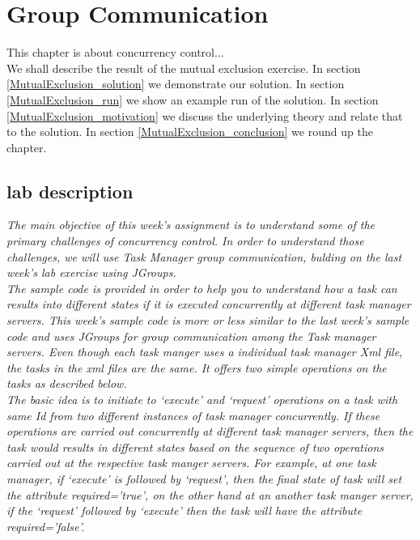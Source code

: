 \chapter{Group Communication}
\minitoc

This chapter is about concurrency control...  \\

We shall describe the result of the mutual exclusion exercise. In section \ref{MutualExclusion_solution} we demonstrate our solution. In section \ref{MutualExclusion_run} we show an example run of the solution. In section \ref{MutualExclusion_motivation} we discuss the underlying theory and relate that to the solution. In section \ref{MutualExclusion_conclusion} we round up the chapter.

\section{lab description}
\textit{The main objective of this week’s assignment is to understand some of the primary challenges of concurrency control. In order to understand those challenges, we will use Task Manager group communication, bulding on the last week’s lab exercise using JGroups.}\\

\textit{The sample code is provided in order to help you to understand how a task can results into different states if it is executed concurrently at different task manager servers. This week’s sample code is more or less similar to the last week’s sample code and uses JGroups for group communication among the Task manager servers. Even though each task manger uses a individual task manager Xml file, the tasks in the xml files are the same. It offers two simple operations on the tasks as described below.}\\



\textit{The basic idea is to initiate to ‘execute’ and ‘request’ operations on a task with same Id from two different instances of task manager concurrently. If these operations are carried out concurrently at different task manager servers, then the task would results in different states based on the sequence of two operations carried out at the respective task manger servers.  For example, at one task manager, if ‘execute’ is followed by ‘request’, then the final state of task will set the attribute required=’true’, on the other hand at an another task manger server, if the ‘request’ followed by ‘execute’ then the task will have the attribute required=’false’.}\\

